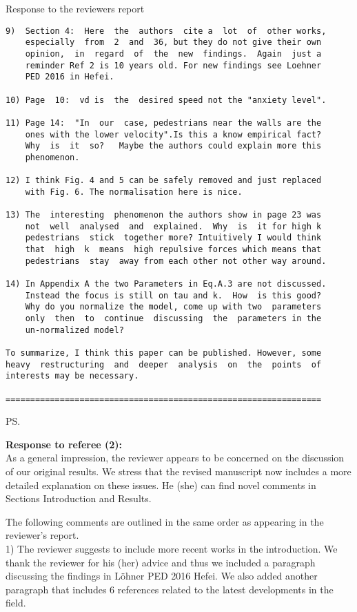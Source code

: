 \documentclass[a4paper,12pt]{letter}
\begin{document}
\begin{letter}{Response to the reviewers report}
\begin{verbatim}
9)  Section 4:  Here  the  authors  cite a  lot  of  other works,
    especially  from  2  and  36, but they do not give their own 
    opinion,  in  regard  of  the  new  findings.  Again  just a 
    reminder Ref 2 is 10 years old. For new findings see Loehner
    PED 2016 in Hefei.

10) Page  10:  vd is  the  desired speed not the "anxiety level".

11) Page 14:  "In  our  case, pedestrians near the walls are the
    ones with the lower velocity".Is this a know empirical fact?
    Why  is  it  so?   Maybe the authors could explain more this
    phenomenon. 

12) I think Fig. 4 and 5 can be safely removed and just replaced 
    with Fig. 6. The normalisation here is nice.

13) The  interesting  phenomenon the authors show in page 23 was
    not  well  analysed  and  explained.  Why  is  it for high k
    pedestrians  stick  together more? Intuitively I would think
    that  high  k  means  high repulsive forces which means that
    pedestrians  stay  away from each other not other way around.

14) In Appendix A the two Parameters in Eq.A.3 are not discussed. 
    Instead the focus is still on tau and k.  How  is this good? 
    Why do you normalize the model, come up with two  parameters
    only  then  to  continue  discussing  the  parameters in the 
    un-normalized model?

To summarize, I think this paper can be published. However, some
heavy  restructuring  and  deeper  analysis  on  the  points  of 
interests may be necessary. 

================================================================

\end{verbatim}


\ps{\textbf{Response to referee (2):} \\

As a general impression, the reviewer appears to be concerned on the discussion of our original results. 
We stress that the revised manuscript now includes a more detailed explanation on these issues. 
He (she) can find novel comments in Sections Introduction and Results. 

The following comments are outlined in the same order as appearing in the
reviewer’s report. \\

1) The reviewer suggests to include more recent works in the introduction. We thank the reviewer for his (her) advice and thus we included a paragraph discussing the findings in L\"ohner PED 2016 Hefei.
We also added another paragraph that includes 6 references related to the latest developments in the field. \\

}
\end{letter}
\end{document}
